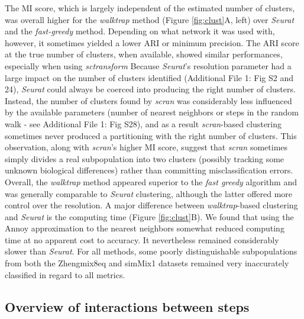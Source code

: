 \documentclass{bmcart}
\begin{document}
{\color{red} The MI score, which is largely independent of the estimated number of clusters, was overall higher for the \textit{walktrap} method (Figure \ref{fig:clust}A, left) over \textit{Seurat} and the \textit{fast-greedy} method. Depending on what network it was used with, however, it sometimes yielded a lower ARI or minimum precision. The ARI score at the true number of clusters, when available, showed similar performances, especially when using \textit{sctransform}} Because \textit{Seurat}'s resolution parameter had a large impact on the number of clusters identified (Additional File 1: Fig S2 and 24), \textit{Seurat} could always be coerced into producing the right number of clusters. Instead, the number of clusters found by \textit{scran} was considerably less influenced by the available parameters (number of nearest neighbors or steps in the random walk - see Additional File 1: Fig S28), and as a result \textit{scran}-based clustering sometimes never produced a partitioning with the right number of clusters. This observation, along with \textit{scran}'s higher MI score, suggest that \textit{scran} sometimes simply divides a real subpopulation into two clusters (possibly tracking some unknown biological differences) rather than committing misclassification errors. {\color{red} Overall, the \textit{walktrap} method appeared superior to the \textit{fast greedy} algorithm and was generally comparable to \textit{Seurat} clustering, although the latter offered more control over the resolution.} A major difference between \textit{walktrap}-based clustering and \textit{Seurat} is the computing time (Figure \ref{fig:clust}B). We found that using the Annoy approximation to the nearest neighbors somewhat reduced computing time at no apparent cost to accuracy. It nevertheless remained considerably slower than \textit{Seurat}. For all methods, some poorly distinguishable subpopulations from both the Zhengmix8eq and simMix1 datasets remained very inaccurately classified in regard to all metrics.

\subsection*{Overview of interactions between steps}
\end{document}
